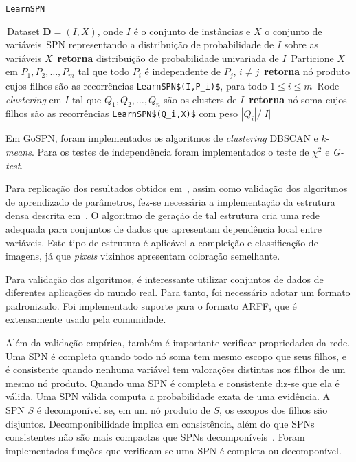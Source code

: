 \documentclass[12pt]{article}
\theoremstyle{plain}
\numberwithin{equation}{section}
\newcommand{\code}[1]{\lstinline[mathescape=true]{#1}}
\newcommand{\mcode}[1]{\lstinline[mathescape]!#1!}
\begin{document}
\begin{algorithm}[H]
  \caption*{\code{LearnSPN}~\cite{gens-domingos}}
  \begin{algorithmic}[1]
    \Require\,Dataset $\mathbf{D}=(I,X)$, onde $I$ é o conjunto de instâncias e $X$ o conjunto de
    variáveis
    \Ensure\,SPN representando a distribuição de probabilidade de $I$ sobre as variáveis $X$
      \State\,\textbf{retorna} distribuição de probabilidade univariada de $I$
    \Else%
      \State\,Particione $X$ em $P_1,P_2,\ldots,P_m$ tal que todo $P_i$ é independente de $P_j$,
      $i\neq j$
        \State\,\textbf{retorna} nó produto cujos filhos são as recorrências
        \mcode{LearnSPN$(I,P_i)$}, para todo $1\leq i\leq m$
      \Else%
        \State\,Rode \textit{clustering} em $I$ tal que $Q_1,Q_2,\ldots,Q_n$ são os clusters de $I$
        \State\,\textbf{retorna} nó soma cujos filhos são as recorrências \mcode{LearnSPN$(Q_i,X)$}
        com peso $|Q_i|/|I|$
      \EndIf%
    \EndIf%
  \end{algorithmic}
\end{algorithm}

Em GoSPN, foram implementados os algoritmos de \textit{clustering} DBSCAN e $k$-\textit{means}.
Para os testes de independência foram implementados o teste de $\chi^2$ e \textit{G-test}.

Para replicação dos resultados obtidos em~\cite{poon-domingos}, assim como validação dos algoritmos
de aprendizado de parâmetros, fez-se necessária a implementação da estrutura densa descrita
em~\cite{poon-domingos}. O algoritmo de geração de tal estrutura cria uma rede adequada para
conjuntos de dados que apresentam dependência local entre variáveis. Este tipo de estrutura é
aplicável a compleição e classificação de imagens, já que \textit{pixels} vizinhos apresentam
coloração semelhante.

Para validação dos algoritmos, é interessante utilizar conjuntos de dados de diferentes aplicações
do mundo real. Para tanto, foi necessário adotar um formato padronizado. Foi implementado suporte
para o formato ARFF, que é extensamente usado pela comunidade.

Além da validação empírica, também é importante verificar propriedades da rede. Uma SPN é completa
quando todo nó soma tem mesmo escopo que seus filhos, e é consistente quando nenhuma variável tem
valorações distintas nos filhos de um mesmo nó produto. Quando uma SPN é completa e consistente
diz-se que ela é válida. Uma SPN válida computa a probabilidade exata de uma evidência. A SPN $S$ é
decomponível se, em um nó produto de $S$, os escopos dos filhos são disjuntos. Decomponibilidade
implica em consistência, além do que SPNs consistentes não são mais compactas que SPNs
decomponíveis~\cite{theoretical-spn}. Foram implementados funções que verificam se uma SPN é
completa ou decomponível.
\end{document}
